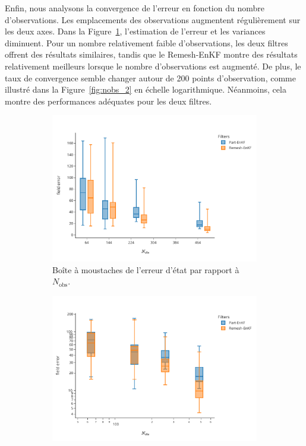 Enfin, nous analysons la convergence de l'erreur en fonction du nombre d'observations. Les emplacements des observations augmentent régulièrement sur les deux axes. Dans la Figure~\ref{fig:nobs_1}, l'estimation de l'erreur et les variances diminuent. Pour un nombre relativement faible d'observations, les deux filtres offrent des résultats similaires, tandis que le Remesh-EnKF montre des résultats relativement meilleurs lorsque le nombre d'observations est augmenté. De plus, le taux de convergence semble changer autour de 200 points d'observation, comme illustré dans la Figure~\ref{fig:nobs_2} en échelle logarithmique. Néanmoins, cela montre des performances adéquates pour les deux filtres.

\begin{figure}[h!]
    \centering
    \begin{subfigure}{0.49\linewidth}
        \centering
        \includegraphics[width=\linewidth]{./images/app2d/final/MSE_nobs_box.pdf}
        \caption{Boîte à moustaches de l'erreur d'état par rapport à $N_{\text{obs}}$.}
        \label{fig:nobs_1}
    \end{subfigure}
    \begin{subfigure}{0.49\linewidth}
        \centering
        \includegraphics[width=\linewidth]{./images/app2d/final/MSE_nobs_box_log_log.pdf}

\end{subfigure}
\end{figure}
